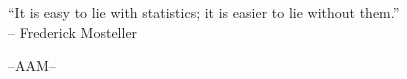 \documentclass[12pt]{exam}
\begin{document}
\vspace{1cm}

\begin{center}
``It is easy to lie with statistics; it is easier to lie without them.''\\
-- Frederick Mosteller
\end{center}

\begin{center}
 \vfill

--AAM--
\end{center}
\par\endgroup
\end{document}
